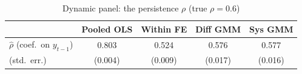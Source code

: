 \begin{table}[htbp]\centering
\caption{Dynamic panel: the persistence \(\rho\) (true \(\rho=0.6\))}
\begin{tabular}{lcccc}
\toprule
 & Pooled OLS & Within FE & Diff GMM & Sys GMM \\
\midrule
\(\hat\rho\) (coef.\ on \(y_{t-1}\)) & 0.803 & 0.524 & 0.576 & 0.577 \\
(std.\ err.) & (0.004) & (0.009) & (0.017) & (0.016) \\
\bottomrule
\end{tabular}
\end{table}

